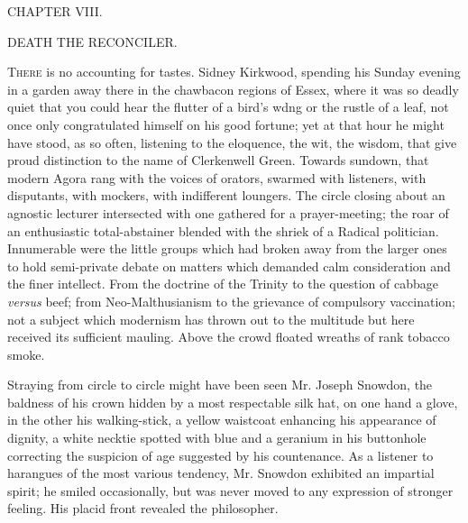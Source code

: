 {}

{CHAPTER VIII.}

DEATH THE RECONCILER.

\textsc{There} is no accounting for tastes. Sidney Kirkwood, spending
his Sunday evening in a garden away there in the chawbacon regions of
Essex, where it was so deadly quiet that you could hear the flutter of a
bird's wdng or the rustle of a leaf, not once only congratulated himself
on his good fortune; yet at that hour he might have stood, as so often,
listening to the eloquence, the wit, the wisdom, that give proud
distinction to the name of Clerkenwell Green. Towards sundown, that
modern Agora rang with the voices of orators, swarmed with listeners,
with disputants, with mockers, with indifferent loungers. The circle
closing about an agnostic lecturer intersected with one gathered for a
prayer-meeting; the roar of an enthusiastic {}total-abstainer blended
with the shriek of a Radical politician. Innumerable were the little
groups which had broken away from the larger ones to hold semi-private
debate on matters which demanded calm consideration and the finer
intellect. From the doctrine of the Trinity to the question of cabbage
\emph{versus} beef; from Neo-Malthusianism to the grievance of
compulsory vaccination; not a subject which modernism has thrown out to
the multitude but here received its sufficient mauling. Above the crowd
floated wreaths of rank tobacco smoke.

Straying from circle to circle might have been seen Mr. Joseph Snowdon,
the baldness of his crown hidden by a most respectable silk hat, on one
hand a glove, in the other his walking-stick, a yellow waistcoat
enhancing his appearance of dignity, a white necktie spotted with blue
and a geranium in his buttonhole correcting the suspicion of age
suggested by his countenance. As a listener to harangues of the most
various tendency, Mr. Snowdon exhibited an impartial spirit; {}he smiled
occasionally, but was never moved to any expression of stronger feeling.
His placid front revealed the philosopher.

